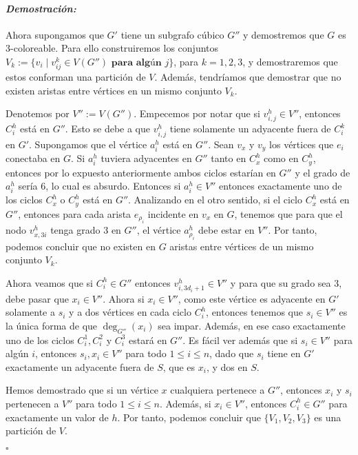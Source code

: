 \documentclass[10pt]{amsart}
\theoremstyle{definition}
\numberwithin{equation}{section}
\newenvironment{myproof} {\paragraph{\emph{Demostraci\'on:}}}{\hfill$\square$}
\begin{document}
\begin{myproof}
	Ahora supongamos que $G'$ tiene un subgrafo c\'ubico $G''$ y demostremos que $G$ es $3$-coloreable. Para ello construiremos los conjuntos $V_k := \{v_i \mid v_{ij}^k \in V(G'')\textbf{ para alg\'un $j$} \}$, para $k = 1,2,3$, y demostraremos que estos conforman una partici\'on de $V$. Adem\'as, tendr\'iamos que demostrar que no existen aristas entre v\'ertices en un mismo conjunto $V_k$.
	
	Denotemos por $V'' := V(G'')$. Empecemos por notar que si $v_{i,j}^h \in V''$, entonces $C_i^h$ est\'a en $G''$. Esto se debe a que $v_{i,j}^h$ tiene solamente un adyacente fuera de $C_i^k$ en $G'$. Supongamos que el v\'ertice $a_i^h$ est\'a en $G''$. Sean $v_x$ y $v_y$ los v\'ertices que  $e_i$ conectaba en $G$. Si $a_i^h$ tuviera adyacentes en $G''$ tanto en $C_x^h$ como en $C_y^h$, entonces por lo expuesto anteriormente ambos ciclos estar\'ian en $G''$ y el grado de $a_i^h$ ser\'ia $6$, lo cual es absurdo. Entonces si $a_i^h \in V''$ entonces exactamente uno de los ciclos $C_x^h$ o $C_y^h$ est\'a en $G''$. Analizando en el otro sentido, si el ciclo $C_x^h$ est\'a en $G''$, entonces para cada arista $e_{\rho_i}$ incidente en $v_x$ en $G$, tenemos que para que el nodo $v_{x,3i}^h$ tenga grado $3$ en $G''$, el v\'ertice $a_{\rho_i}^h$ debe estar en $V''$. Por tanto, podemos concluir que no existen en $G$ aristas entre v\'ertices de un mismo conjunto $V_k$.
	
	Ahora veamos que si $C_i^h \in G''$ entonces $v_{i,3d_i + 1}^h \in V''$ y para que su grado sea $3$, debe pasar que $x_i \in V''$. Ahora si $x_i \in V''$, como este v\'ertice es adyacente en $G'$ solamente a $s_i$ y a dos v\'ertices en cada ciclo $C_i^h$, entonces tenemos que $s_i \in V''$ es la \'unica forma de que $\deg_{G''}(x_i)$ sea impar. Adem\'as, en ese caso exactamente uno de los ciclos $C_i^1, C_i^2$ y $C_i^3$ estar\'a en $G''$. Es f\'acil ver adem\'as que si $s_i \in V''$ para alg\'un $i$, entonces $s_i, x_i \in V''$ para todo $1 \le i \le n$, dado que $s_i$ tiene en $G'$ exactamente un adyacente fuera de $S$, que es $x_i$, y dos en $S$.
	
	Hemos demostrado que si un v\'ertice $x$ cualquiera pertenece a $G''$, entonces $x_i$ y  $s_i$ pertenecen a $V''$ para todo $1 \le i \le n$. Adem\'as, si $x_i \in V''$, entonces $C_i^h \in G''$ para exactamente un valor de $h$.  Por tanto, podemos concluir que $\{V_1, V_2, V_3\}$ es una partici\'on de $V$. 

	
	
\end{myproof}
\end{document}
